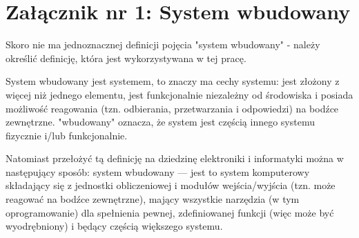 \documentclass[../main]{subfiles}
\begin{document}
\section*{Załącznik nr 1: System wbudowany}\label{sec:zalacznik-1}

Skoro nie ma jednoznacznej definicji pojęcia "system wbudowany" - należy określić definicję, która jest
wykorzystywana w tej pracę.

System wbudowany jest systemem, to znaczy ma cechy systemu: jest złożony z więcej niż jednego elementu,
jest funkcjonalnie niezależny od środowiska i posiada możliwość reagowania (tzn. odbierania,
przetwarzania i odpowiedzi) na bodźce zewnętrzne. "wbudowany" oznacza, że system jest częścią innego
systemu fizycznie i/lub
funkcjonalnie.

Natomiast przełożyć tą definicję na dziedzinę elektroniki i informatyki można w następujący sposób:
system wbudowany — jest to system komputerowy składający się z jednostki obliczeniowej i modułów
wejścia/wyjścia (tzn. może reagować na bodźce zewnętrzne), mający wszystkie narzędzia (w tym
oprogramowanie) dla spełnienia pewnej, zdefiniowanej funkcji (więc może być wyodrębniony) i będący
częścią większego systemu.
\end{document}
